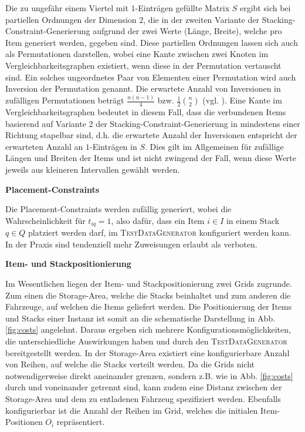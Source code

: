 Die zu ungefähr einem Viertel mit $1$-Einträgen gefüllte Matrix $S$ ergibt sich bei partiellen Ordnungen der Dimension $2$,
die in der zweiten Variante der Stacking-Constraint-Generierung aufgrund der zwei Werte (Länge, Breite),
welche pro Item generiert werden, gegeben sind.
Diese partiellen Ordnungen lassen sich auch als Permutationen darstellen, wobei eine Kante zwischen
zwei Knoten im Vergleichbarkeitsgraphen existiert, wenn diese in der Permutation
vertauscht sind. Ein solches ungeordnetes Paar von Elementen einer Permutation wird auch Inversion
der Permutation genannt. Die erwartete Anzahl von Inversionen in zufälligen Permutationen
beträgt $\frac{n (n - 1)}{4}$ bzw. $\frac{1}{2} \binom{n}{2}$ (vgl. \citet{Heuberger2012}).
Eine Kante im Vergleichbarkeitsgraphen bedeutet in diesem Fall, dass die verbundenen Items
basierend auf Variante 2 der Stacking-Constraint-Generierung in mindestens einer Richtung stapelbar sind,
d.h. die erwartete Anzahl der Inversionen entspricht der erwarteten Anzahl an $1$-Einträgen in $S$.
Dies gilt im Allgemeinen für zufällige Längen und Breiten der Items und ist nicht zwingend der Fall,
wenn diese Werte jeweils aus kleineren Intervallen gewählt werden.

\textbf{Placement-Constraints}

Die Placement-Constraints werden zufällig generiert, wobei die Wahrscheinlichkeit für $t_{iq} = 1$, also dafür,
dass ein Item $i \in I$ in einem Stack $q \in Q$ platziert werden darf, im \textsc{TestDataGenerator} konfiguriert werden kann.
In der Praxis sind tendenziell mehr Zuweisungen erlaubt als verboten.

\textbf{Item- und Stackpositionierung}

Im Wesentlichen liegen der Item- und Stackpositionierung zwei Grids zugrunde. Zum einen die Storage-Area,
welche die Stacks beinhaltet und zum anderen die Fahrzeuge, auf welchen die Items geliefert werden.
Die Positionierung der Items und Stacks einer Instanz ist somit an die schematische Darstellung in Abb. \ref{fig:costs}
angelehnt. Daraus ergeben sich mehrere Konfigurationsmöglichkeiten, die unterschiedliche Auswirkungen haben
und durch den \textsc{TestDataGenerator} bereitgestellt werden.
In der Storage-Area existiert eine konfigurierbare Anzahl von Reihen, auf welche die Stacks verteilt werden.
Da die Grids nicht notwendigerweise direkt aneinander grenzen, sondern z.B. wie in Abb. \ref{fig:costs}
durch  und  voneinander getrennt sind, kann zudem eine Distanz
zwischen der Storage-Area und dem zu entladenen Fahrzeug spezifiziert werden.
Ebenfalls konfigurierbar ist die Anzahl der Reihen im Grid, welches die initialen Item-Positionen $O_i$ repräsentiert.

